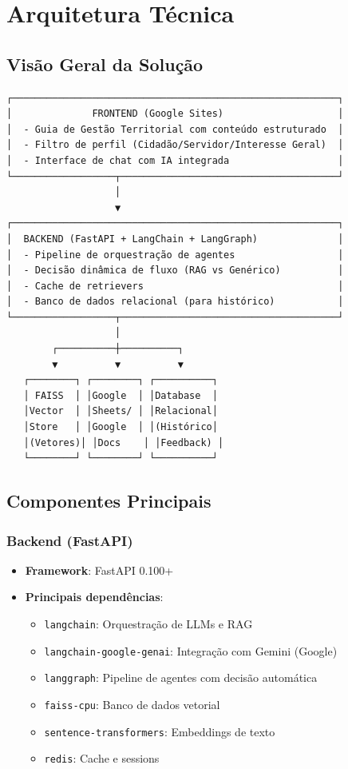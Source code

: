 \documentclass[12pt,a4paper]{report}
\begin{document}
\chapter{Arquitetura Técnica}

\section{Visão Geral da Solução}

\begin{verbatim}
┌─────────────────────────────────────────────────────────┐
│              FRONTEND (Google Sites)                    │
│  - Guia de Gestão Territorial com conteúdo estruturado  │
│  - Filtro de perfil (Cidadão/Servidor/Interesse Geral)  │
│  - Interface de chat com IA integrada                   │
└──────────────────┬──────────────────────────────────────┘
                   │
                   ▼
┌─────────────────────────────────────────────────────────┐
│  BACKEND (FastAPI + LangChain + LangGraph)              │
│  - Pipeline de orquestração de agentes                  │
│  - Decisão dinâmica de fluxo (RAG vs Genérico)          │
│  - Cache de retrievers                                  │
│  - Banco de dados relacional (para histórico)           │
└──────────────────┬──────────────────────────────────────┘
                   │
        ┌──────────┼──────────┐
        ▼          ▼          ▼
   ┌────────┐ ┌────────┐ ┌──────────┐
   │ FAISS  │ │Google  │ │Database  │
   │Vector  │ │Sheets/ │ │Relacional│
   │Store   │ │Google  │ │(Histórico│
   │(Vetores)│ │Docs    │ │Feedback) │
   └────────┘ └────────┘ └──────────┘
\end{verbatim}

\section{Componentes Principais}

\subsection{Backend (FastAPI)}

\begin{itemize}
  \item \textbf{Framework}: FastAPI 0.100+
  \item \textbf{Principais dependências}:
  \begin{itemize}
    \item \texttt{langchain}: Orquestração de LLMs e RAG
    \item \texttt{langchain-google-genai}: Integração com Gemini (Google)
    \item \texttt{langgraph}: Pipeline de agentes com decisão automática
    \item \texttt{faiss-cpu}: Banco de dados vetorial
    \item \texttt{sentence-transformers}: Embeddings de texto
    \item \texttt{redis}: Cache e sessions
  \end{itemize}
\end{itemize}
\end{document}
